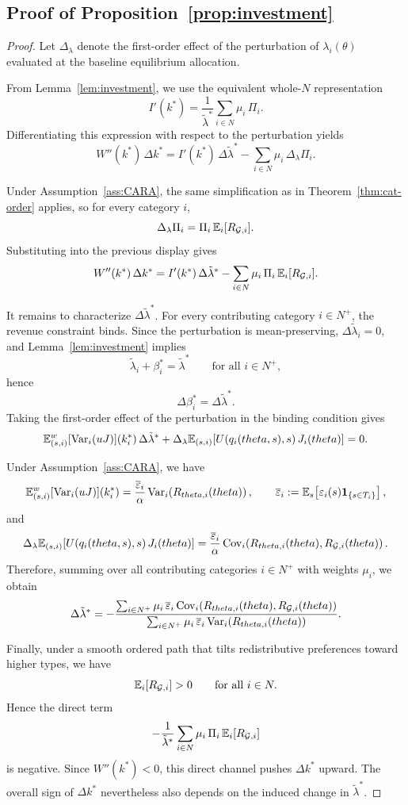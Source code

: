 \documentclass[master.tex]{subfiles}
\begin{document}
\subsection{Proof of Proposition~\ref{prop:investment}}
\begin{proof}
Let \(\Delta_\lambda\) denote the first-order effect of the perturbation of
\(\lambda_i(\theta)\) evaluated at the baseline equilibrium allocation.

From Lemma~\ref{lem:investment}, we use the equivalent whole-\(N\)
representation
\[
I'(k^\ast)
=
\frac{1}{\tilde\lambda^\ast}
\sum_{i\in N}\mu_i\,\Pi_i.
\]
Differentiating this expression with respect to the perturbation yields
\[
W''(k^\ast)\,\Delta k^\ast
=
I'(k^\ast)\,\Delta\tilde\lambda^\ast
-
\sum_{i\in N}\mu_i\,\Delta_\lambda \Pi_i.
\]

Under Assumption~\ref{ass:CARA}, the same simplification as in
Theorem~\ref{thm:cat-order} applies, so for every category \(i\),
\[
\Delta_\lambda \Pi_i
=
\Pi_i\,\mathbb{E}_i[R_{\mathcal{G},i}].
\]
Substituting into the previous display gives
\[
W''(k^\ast)\,\Delta k^\ast
=
I'(k^\ast)\,\Delta\tilde\lambda^\ast
-
\sum_{i\in N}\mu_i\,\Pi_i\,\mathbb{E}_i[R_{\mathcal{G},i}].
\]

It remains to characterize \(\Delta\tilde\lambda^\ast\). For every contributing
category \(i\in N^+\), the revenue constraint binds. Since the perturbation is
mean-preserving, \(\Delta\tilde\lambda_i=0\), and Lemma~\ref{lem:investment}
implies
\[
\tilde\lambda_i+\beta_i^\ast=\tilde\lambda^\ast
\qquad\text{for all }i\in N^+,
\]
hence
\[
\Delta\beta_i^\ast=\Delta\tilde\lambda^\ast.
\]
Taking the first-order effect of the perturbation in the binding condition gives
\[
\mathbb{E}_{(s,i)}^w[\mathrm{Var}_i(uJ)](k_i^\ast)\,\Delta\tilde\lambda^\ast
+
\Delta_\lambda
\mathbb{E}_{(s,i)}\!\left[
U(q_i(theta,s),s)\,J_i(theta)
\right]
=
0.
\]

Under Assumption~\ref{ass:CARA}, we have
\[
\mathbb{E}_{(s,i)}^w[\mathrm{Var}_i(uJ)](k_i^\ast)
=
\frac{\overline\varepsilon_i}{\alpha}\,
\mathrm{Var}_{i}\!\left(R_{theta,i}(theta)\right),
\qquad
\overline\varepsilon_i
:=
\mathbb{E}_s\!\left[
\varepsilon_i(s)\mathbf 1_{\{s\in T_i\}}
\right],
\]
and
\[
\Delta_\lambda
\mathbb{E}_{(s,i)}\!\left[
U(q_i(theta,s),s)\,J_i(theta)
\right]
=
\frac{\overline\varepsilon_i}{\alpha}\,
\mathrm{Cov}_{i}\!\left(
R_{theta,i}(theta),R_{\mathcal{G},i}(theta)
\right).
\]
Therefore, summing over all contributing categories \(i\in N^+\) with weights
\(\mu_i\), we obtain
\[
\Delta\tilde\lambda^\ast
=
-
\frac{
\sum_{i\in N^+}\mu_i\,\overline\varepsilon_i\,
\mathrm{Cov}_{i}\!\left(
R_{theta,i}(theta),R_{\mathcal{G},i}(theta)
\right)
}{
\sum_{i\in N^+}\mu_i\,\overline\varepsilon_i\,
\mathrm{Var}_{i}\!\left(
R_{theta,i}(theta)
\right)
}.
\]

Finally, under a smooth ordered path that tilts redistributive preferences toward
higher types, we have
\[
\mathbb{E}_i[R_{\mathcal{G},i}]>0
\qquad\text{for all }i\in N.
\]
Hence the direct term
\[
-\frac{1}{\tilde\lambda^\ast}
\sum_{i\in N}\mu_i\,\Pi_i\,\mathbb{E}_i[R_{\mathcal{G},i}]
\]
is negative. Since \(W''(k^\ast)<0\), this direct channel pushes \(\Delta k^\ast\)
upward. The overall sign of \(\Delta k^\ast\) nevertheless also depends on the
induced change in \(\tilde\lambda^\ast\).
\end{proof}
\end{document}
